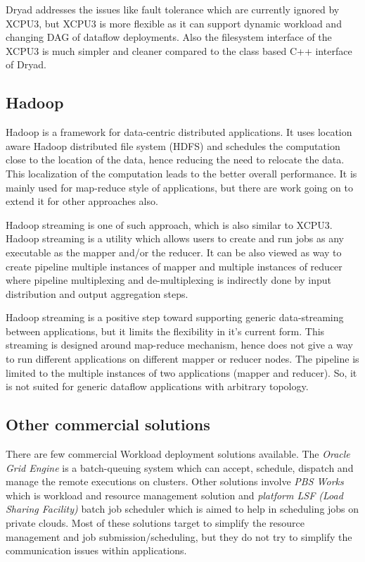 \documentclass{sig-alternate}
\begin{document}
Dryad addresses the issues like fault tolerance which are currently ignored by
XCPU3, but XCPU3 is more flexible as it can support dynamic workload and
changing DAG of dataflow deployments. Also the filesystem interface of the XCPU3
is much simpler and cleaner compared to the class based C++ interface of Dryad.

\subsection{Hadoop}
Hadoop is a framework for data-centric distributed applications.   It
uses location aware Hadoop distributed file system (HDFS) and schedules the
computation close to the location of the data, hence reducing the need to
relocate the data.  This localization of the computation leads to the better
overall performance.  It is mainly used for map-reduce style of applications,
but there are work going on to extend it for other approaches also.

Hadoop streaming is one of such approach, which is also similar to XCPU3.
Hadoop streaming is a utility which allows users to create and run jobs as any
executable as the mapper and/or the reducer.  It can be also viewed as way to
create pipeline multiple instances of mapper and multiple instances of reducer
where pipeline multiplexing and de-multiplexing is indirectly done by input
distribution and output aggregation steps.

Hadoop streaming is a positive step toward supporting generic data-streaming
between applications, but it limits the flexibility in it's current form. 
This streaming is designed around map-reduce mechanism, hence does not give a
way to run different applications on different mapper or reducer nodes.  The
pipeline is limited to the multiple instances of two applications
(mapper and reducer).  So, it is not suited for generic dataflow applications
with arbitrary topology.

\subsection{Other commercial solutions}
There are few commercial Workload deployment solutions available.  The
\textit{Oracle Grid Engine}\cite{oge} is a batch-queuing system which can
accept, schedule, dispatch and manage the remote executions on clusters. 
Other solutions involve \textit{PBS Works}\cite{pbsworks} which is workload
and resource management solution and \textit{platform LSF (Load Sharing
Facility)}\cite{platformLSF} batch job scheduler which is aimed to help in
scheduling jobs on private clouds.  Most of these solutions target to simplify
the resource management and job submission/scheduling, but they do not try to
simplify the communication issues within applications.
\end{document}
